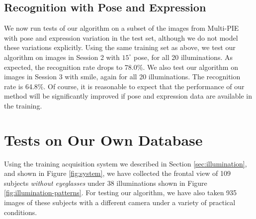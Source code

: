 \documentclass[12pt,journal,draftcls,letterpaper,onecolumn]{IEEEtran}
\begin{document}
\subsection{Recognition with Pose and Expression} We now run tests of
our algorithm on a subset of the images from Multi-PIE with pose and expression variation in the test set, although we do not model these variations explicitly.
Using the same training set as above, we test our algorithm on
images in Session 2 with $15^\circ$ pose, for all 20
illuminations. As expected, the recognition rate drops to 78.0\%. We also test our
algorithm on images in Session 3 with smile, again for all 20
illuminations. The recognition rate is 64.8\%. Of course, it is reasonable to expect that
the performance of our method will be significantly improved if pose and expression data
are available in the training.


\section{Tests on Our Own Database}\label{sec:own-data} Using the training acquisition
system we described in Section \ref{sec:illumination}, and shown in Figure
\ref{fig:system}, we have collected the frontal view of 109
subjects {\em without eyeglasses} under 38 illuminations shown
in Figure \ref{fig:illumination-patterns}. For testing our
algorithm, we have also taken 935 images of these subjects with
a different camera under a variety of practical conditions.
\end{document}
